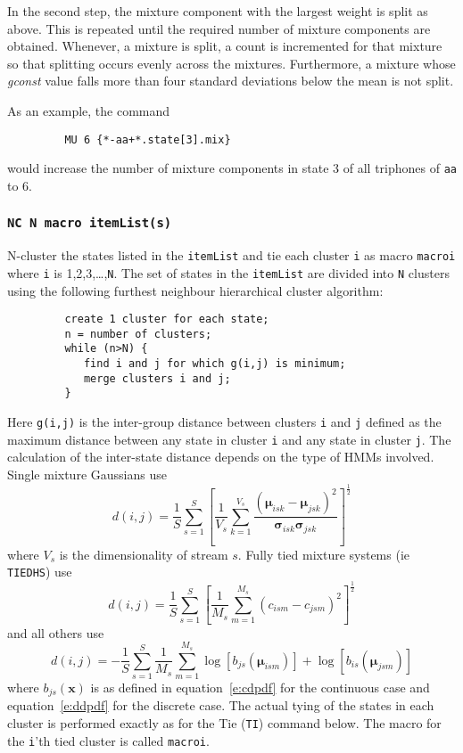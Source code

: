 In the second step, the mixture component with the largest
weight is split as above.  This is repeated until the required
number of mixture components are obtained.
Whenever, a mixture is split, a count is incremented  for that mixture
so that splitting occurs evenly across the mixtures.  Furthermore,
a mixture whose {\it gconst} value falls more than four standard
deviations below the mean is not split.

As an example, the command
\begin{verbatim}
         MU 6 {*-aa+*.state[3].mix}
\end{verbatim}
would increase the number of mixture components in state 3
of all triphones of \texttt{aa} to 6.

\subsubsection*{\tt NC N macro itemList(s)}

N-cluster the states listed in the 
\texttt{itemList} and tie each cluster \texttt{i} as macro \texttt{macroi}
where \texttt{i} is 1,2,3,\ldots,\texttt{N}.
The set of states in the \texttt{itemList} are divided into \texttt{N}
clusters using the following furthest neighbour hierarchical
cluster algorithm:
\begin{verbatim}
         create 1 cluster for each state;
         n = number of clusters;
         while (n>N) {
            find i and j for which g(i,j) is minimum;
            merge clusters i and j;
         }
\end{verbatim}
Here \texttt{g(i,j)} is the inter-group distance between
clusters \texttt{i} and \texttt{j} defined as the maximum
distance between any state in cluster \texttt{i} and any state
in cluster \texttt{j}.  The calculation of the inter-state
distance depends on the type of HMMs involved.  Single
mixture Gaussians use
\begin{equation}
  d(i,j) = \frac{1}{S} \sum_{s=1}^S
        \left[  
           \frac{1}{V_s} \sum_{k=1}^{V_s}
                 \frac{(\bm{\mu}_{isk} - \bm{\mu}_{jsk})^2}{
                         \bm{\sigma}_{isk}\bm{\sigma}_{jsk}}
        \right]^{\frac{1}{2}}
\end{equation}
where $V_s$ is the dimensionality of stream $s$.  Fully tied
mixture systems (ie \texttt{TIEDHS}) use
\begin{equation}
  d(i,j) = \frac{1}{S} \sum_{s=1}^S
        \left[  
           \frac{1}{M_s} \sum_{m=1}^{M_s}
                (c_{ism} - c_{jsm})^2
        \right]^{\frac{1}{2}}
\end{equation}
and all others use
\begin{equation}
  d(i,j) = - \frac{1}{S} \sum_{s=1}^S
         \frac{1}{M_s} \sum_{m=1}^{M_s}
          \log[b_{js}(\bm{\mu}_{ism})] + \log[b_{is}(\bm{\mu}_{jsm})]
\end{equation}
where $b_{js}(\bm{x})$ is as defined in equation~\ref{e:cdpdf} for
the continuous case and equation~\ref{e:ddpdf} for the discrete case.  The actual
tying of the states in each cluster is performed exactly as for
the Tie (\texttt{TI}) command below.  The macro for the \texttt{i}'th
tied cluster is called \texttt{macroi}.

